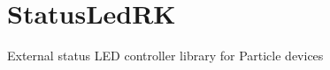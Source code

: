 \chapter{Status\+Led\+RK}
\hypertarget{index}{}\label{index}
\label{index_md__r_e_a_d_m_e}%
%
External status LED controller library for Particle devices 